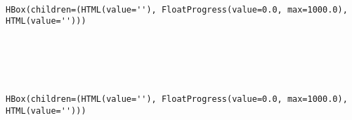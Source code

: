 \documentclass[11pt]{article}
\begin{document}
    \begin{center}
    \end{center}
    { \hspace*{\fill} \\}
    
    
    \begin{Verbatim}[commandchars=\\\{\}]
HBox(children=(HTML(value=''), FloatProgress(value=0.0, max=1000.0), HTML(value='')))
    \end{Verbatim}

    
    \begin{Verbatim}[commandchars=\\\{\}]

    \end{Verbatim}

    \begin{center}
    \end{center}
    { \hspace*{\fill} \\}
    
    \begin{center}
    \end{center}
    { \hspace*{\fill} \\}
    
    
    \begin{Verbatim}[commandchars=\\\{\}]
HBox(children=(HTML(value=''), FloatProgress(value=0.0, max=1000.0), HTML(value='')))
    \end{Verbatim}

    
    \begin{Verbatim}[commandchars=\\\{\}]

    \end{Verbatim}

    \begin{center}
    \end{center}
    { \hspace*{\fill} \\}
    
\end{document}
